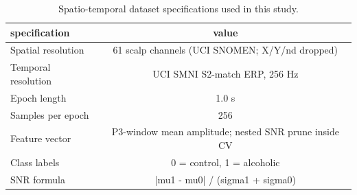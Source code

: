 \begin{table}[!t]
\centering
\caption{Spatio-temporal dataset specifications used in this study.}
\label{tab:data-specs}
\begin{tabular}{lc}
\hline
\textbf{specification} & \textbf{value} \\
\hline
Spatial resolution & 61 scalp channels (UCI SNOMEN; X/Y/nd dropped) \\
Temporal resolution & UCI SMNI S2-match ERP, 256 Hz \\
Epoch length & 1.0 s \\
Samples per epoch & 256 \\
Feature vector & P3-window mean amplitude; nested SNR prune inside CV \\
Class labels & 0 = control, 1 = alcoholic \\
SNR formula & |mu1 - mu0| / (sigma1 + sigma0) \\
\hline
\end{tabular}
\end{table}
